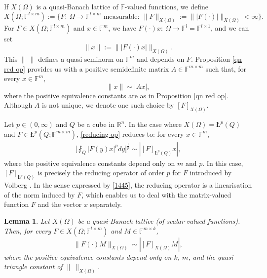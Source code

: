 \documentclass[11pt, reqno]{amsart}
\newtheorem{lemma}[theorem]{Lemma}
\theoremstyle{definition}
\theoremstyle{remark}
\numberwithin{equation}{section}
\newcommand{\F}{\mathbb F}
\newcommand{\R}{\mathbb R}
\newcommand{\aveL}{\textit{\L}}
\newcommand{\pdef}[1]{\F^{#1\times #1}_+}
\begin{document}
If $X(\Omega)$ is a quasi-Banach lattice of $\F$-valued functions, we define
\begin{equation*}
X(\Omega;\F^{l\times m})
:=\Big\{F:\ \Omega\to\F^{l\times m}\text{ measurable}:\
\|F\|_{X(\Omega)}:=\big\||F(\cdot)|\big\|_{X(\Omega)}<\infty\Big\}.
\end{equation*}
For $F\in X(\Omega;\F^{l\times m})$ and $x\in\F^m$,
we have $F(\cdot)x:\ \Omega\to\F^l=\F^{l\times 1}$, and we can set
\begin{equation*}
\|x\|:= \big\| |F(\cdot)x| \big\|_{X(\Omega)}.
\end{equation*}
This $\|\ \|$ defines a quasi-seminorm on $\F^m$
and depends on $F$.
Proposition \ref{qn red op} provides us with a positive semidefinite matrix $A\in\F^{m\times m}$ such that,
for every $x\in \F^m$,
\begin{equation}\label{reducing op}
\|x\|\sim|Ax|,
\end{equation}
where the positive equivalence constants are as in Proposition \ref{qn red op}.
Although $A$ is not unique, we denote one such choice by $[F]_{X(\Omega)}$.

Let $p\in(0,\infty)$ and $Q$ be a cube in $\R^n$.
In the case where $X(\Omega)=\aveL^{p}(Q)$
and $F\in\aveL^{p}(Q;\pdef{m})$, \eqref{reducing op} reduces to:
for every $x\in \F^m$,
\begin{align}\label{1445}
\bigg[\fint_Q |F(y)x|^p dy\bigg]^{\frac1p}
\sim |[F]_{\aveL^{p}(Q)} x|,
\end{align}
where the positive equivalence constants depend only on $m$ and $p$.
In this case, $[F]_{\aveL^{p}(Q)}$ is precisely the reducing operator
of order $p$ for $F$ introduced by Volberg \cite[p.\,450]{Vol97}.
In the sense expressed by \eqref{1445}, the reducing operator is a linearisation of the norm induced by $F$, which enables us to deal with the matrix-valued function $F$ and the vector $x$ separately.

\begin{lemma}\label{red op M}
Let $X(\Omega)$ be a quasi-Banach lattice
(of scalar-valued functions).
Then, for every $F\in X(\Omega;\F^{l\times m})$ and $M\in\F^{m\times k}$,
\begin{equation*}
\| F(\cdot)M \|_{X(\Omega)}\sim |[F]_{X(\Omega)} M|,
\end{equation*}
where the positive equivalence constants depend only on $k$, $m$,
and the quasi-triangle constant of $\|\ \|_{X(\Omega)}$.
\end{lemma}
\end{document}
